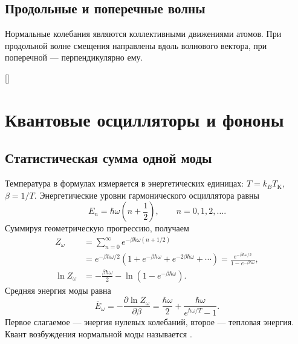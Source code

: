 \documentclass[../final.tex]{subfiles}
\begin{document}
\subsection{Продольные и поперечные волны}
Нормальные колебания являются коллективными движениями атомов.
При продольной волне смещения направлены вдоль волнового вектора,
при поперечной --- перпендикулярно ему.

\begin{rbox}[unbreakable,left=14pt,right=14pt,top=8pt,bottom=6pt]{[]}
\centering
\captionsetup{font=footnotesize,hypcap=false,skip=5pt}
\end{rbox}

\clearpage
\section{Квантовые осцилляторы и фононы}
\subsection{Статистическая сумма одной моды}
Температура в формулах измеряется в энергетических единицах:
$T=k_BT_{\mathrm K}$, $\beta=1/T$.
Энергетические уровни гармонического осциллятора равны
\begin{equation*}
 E_n=\hbar\omega\left(n+\frac12\right),\qquad n=0,1,2,\ldots.
\end{equation*}
Суммируя геометрическую прогрессию, получаем
\begin{align*}
 Z_\omega&=\sum_{n=0}^{\infty}e^{-\beta\hbar\omega(n+1/2)}\\
 &=e^{-\beta\hbar\omega/2}
 \left(1+e^{-\beta\hbar\omega}+e^{-2\beta\hbar\omega}+\cdots\right)
 =\frac{e^{-\beta\hbar\omega/2}}{1-e^{-\beta\hbar\omega}},\\
 \ln Z_\omega&=-\frac{\beta\hbar\omega}{2}
 -\ln(1-e^{-\beta\hbar\omega}).
\end{align*}
Средняя энергия моды равна
\begin{equation*}
 \overline E_\omega=-\frac{\partial\ln Z_\omega}{\partial\beta}
 =\frac{\hbar\omega}{2}+\frac{\hbar\omega}{e^{\hbar\omega/T}-1}.
\end{equation*}
Первое слагаемое --- энергия нулевых колебаний, второе --- тепловая энергия.
Квант возбуждения нормальной моды называется .
\end{document}
